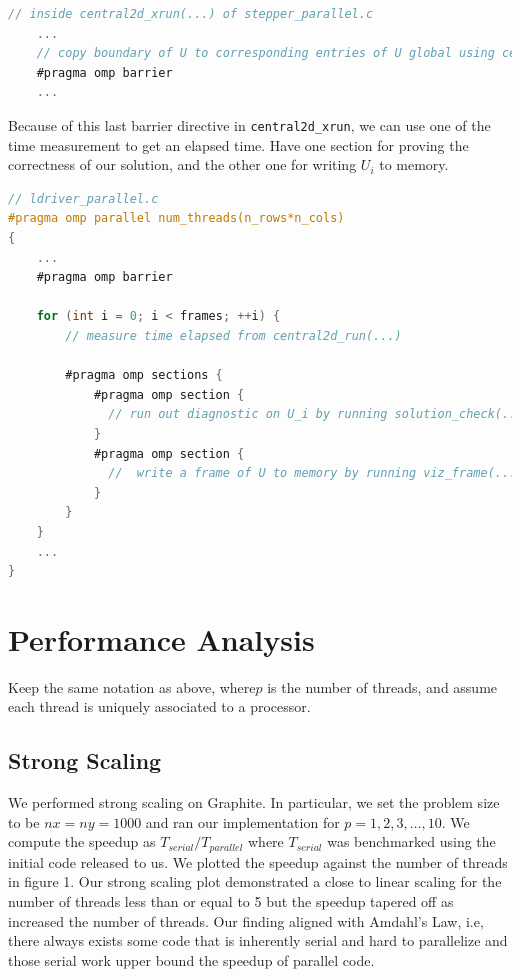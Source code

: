\documentclass{article}
\begin{document}
\begin{lstlisting}[language=C]
// inside central2d_xrun(...) of stepper_parallel.c
    ...
    // copy boundary of U to corresponding entries of U global using central2d_local_to_global(...)
    #pragma omp barrier
    ...
\end{lstlisting}

Because of this last barrier directive in \texttt{central2d\_xrun}, we can use one of the time measurement to get an elapsed time. Have one section for proving the correctness of our solution, and the other one for writing $U_i$ to memory.

\begin{lstlisting}[language=C]
// ldriver_parallel.c
#pragma omp parallel num_threads(n_rows*n_cols)
{
    ...
    #pragma omp barrier
    
    for (int i = 0; i < frames; ++i) {
        // measure time elapsed from central2d_run(...)
        
        #pragma omp sections {
            #pragma omp section {
              // run out diagnostic on U_i by running solution_check(...)
            }
            #pragma omp section {
              //  write a frame of U to memory by running viz_frame(...);
            }
        }
    }
    ...
}
\end{lstlisting}

\section{Performance Analysis}

Keep the same notation as above, where$p$ is the number of threads, and assume each thread is uniquely associated to a processor.

\subsection{Strong Scaling}

We performed strong scaling on Graphite. In particular, we set the problem size to be $nx = ny = 1000$ and ran our implementation for $p = 1, 2, 3, \ldots, 10$. We compute the speedup as $T_{serial} / T_{parallel}$ where $T_{serial}$ was benchmarked using the initial code released to us. We plotted the speedup against the number of threads in figure 1. Our strong scaling plot demonstrated a close to linear scaling for the number of threads less than or equal to 5 but the speedup tapered off as increased the number of threads. Our finding aligned with Amdahl’s Law, i.e, there always exists some code that is inherently serial and hard to parallelize and those serial work upper bound the speedup of parallel code.
\end{document}
